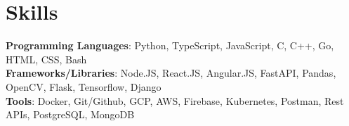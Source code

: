 \documentclass[letterpaper,11pt]{article}
\begin{document}
\section{Skills}
 \begin{itemize}[leftmargin=0.15in, label={}]
    \small{\item{
     \textbf{Programming Languages}{: Python, TypeScript, JavaScript, C, C++, Go, HTML, CSS, Bash} \\
     \textbf{Frameworks/Libraries}{: Node.JS, React.JS, Angular.JS, FastAPI, Pandas, OpenCV, Flask, Tensorflow, Django} \\
     \textbf{Tools}{: Docker, Git/Github, GCP, AWS, Firebase, Kubernetes, Postman, Rest APIs, PostgreSQL, MongoDB}
    }}
 \end{itemize}


\end{document}
